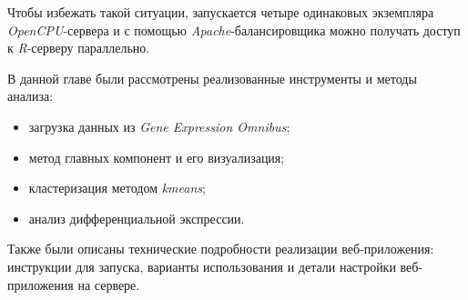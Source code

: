 Чтобы избежать такой ситуации, запускается четыре одинаковых экземпляра \emph{OpenCPU}-сервера и с помощью \emph{Apache}-балансировщика можно получать доступ к \emph{R}-серверу параллельно.

\chapterconclusion
В данной главе были рассмотрены реализованные инструменты и методы анализа:\begin{itemize}
\item загрузка данных из \emph{Gene Expression Omnibus};
\item метод главных компонент и его визуализация;
\item кластеризация методом \emph{kmeans};
\item анализ дифференциальной экспрессии. \end{itemize}

Также были описаны технические подробности реализации веб-приложения: инструкции для запуска, варианты использования и детали настройки веб-приложения на сервере.
